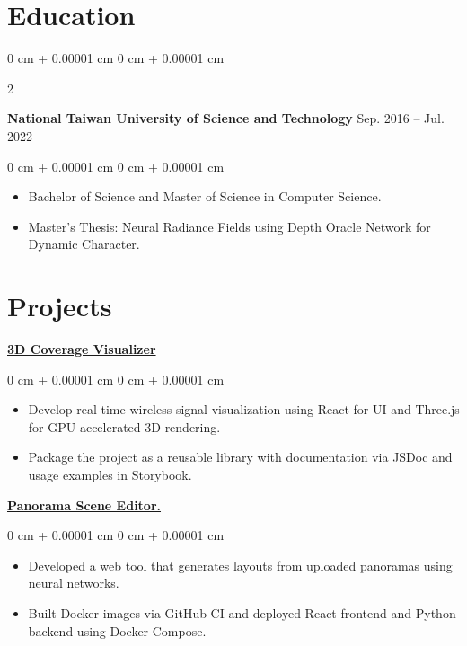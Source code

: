 \documentclass[10pt, letterpaper]{article}
\newenvironment{highlights}{
    \begin{itemize}[
        topsep=0.10 cm,
        parsep=0.10 cm,
        partopsep=0pt,
        itemsep=0pt,
        leftmargin=0 cm + 10pt
    ]
}{
    \end{itemize}
} %
\newenvironment{onecolentry}{
    \begin{adjustwidth}{
        0 cm + 0.00001 cm
    }{
        0 cm + 0.00001 cm
    }
}{
    \end{adjustwidth}
} %
\newenvironment{twocolentry}[2][]{
    \onecolentry
    \def\secondColumn{#2}
    \setcolumnwidth{\fill, 4.5 cm}
    \begin{paracol}{2}
}{
    \switchcolumn \raggedleft \secondColumn
    \end{paracol}
    \endonecolentry
} %
\begin{document}
    
    
    \section{Education}
    
     \begin{twocolentry}{
        Sep. 2016 – Jul. 2022
    }
        \textbf{National Taiwan University of Science and Technology}\end{twocolentry}
    
    
    \vspace{0.10 cm}
    \begin{onecolentry}
        \begin{highlights}
            \item Bachelor of Science and Master of Science in Computer Science.
            \item Master’s Thesis: Neural Radiance Fields using Depth Oracle Network for Dynamic Character.
        \end{highlights}
    \end{onecolentry}
    
    
    \section{Projects}
        \href{https://github.com/tsengyushiang/coverage-visualizer}{\textbf{3D Coverage Visualizer}}

        \vspace{0.10 cm}
        \begin{onecolentry}
            \begin{highlights}
                \item Develop real-time wireless signal visualization using React for UI and Three.js for GPU-accelerated 3D rendering.
                \item Package the project as a reusable library with documentation via JSDoc and usage examples in Storybook.
            \end{highlights}
        \end{onecolentry}

        \vspace{0.2 cm}

        \href{https://github.com/tsengyushiang/pano-to-mesh}{\textbf{Panorama Scene Editor.}}
        \vspace{0.10 cm}
        \begin{onecolentry}
            \begin{highlights}
                \item Developed a web tool that generates layouts from uploaded panoramas using neural networks.
                \item Built Docker images via GitHub CI and deployed React frontend and Python backend using Docker Compose.
            \end{highlights}
        \end{onecolentry}
        
\end{document}
